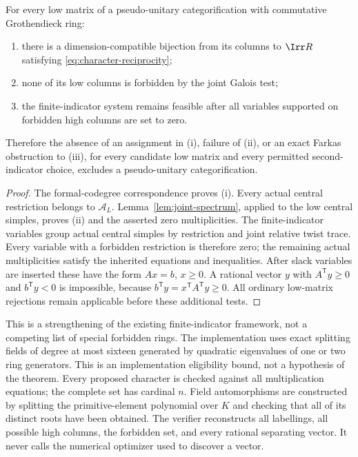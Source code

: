 \begin{theorem}
\label{thm:character-induction}
For every low matrix of a pseudo-unitary categorification with
commutative Grothendieck ring:
\begin{enumerate}[label=(\roman*)]
\item there is a dimension-compatible bijection from its columns to
$\Irr R$ satisfying \eqref{eq:character-reciprocity};
\item none of its low columns is forbidden by the joint Galois test;
\item the finite-indicator system remains feasible after all variables
supported on forbidden high columns are set to zero.
\end{enumerate}
Therefore the absence of an assignment in (i), failure of (ii), or an
exact Farkas obstruction to (iii), for every candidate low matrix and
every permitted second-indicator choice, excludes a pseudo-unitary
categorification.
\end{theorem}
\begin{proof}
The formal-codegree correspondence proves (i). Every actual central
restriction belongs to $\mathcal A_L$. Lemma~\ref{lem:joint-spectrum},
applied to the low central simples, proves (ii) and the asserted zero
multiplicities. The finite-indicator variables group actual central
simples by restriction and joint relative twist trace. Every variable
with a forbidden restriction is therefore zero; the remaining actual
multiplicities satisfy the inherited equations and inequalities.
After slack variables are inserted these have the form $Ax=b$, $x\ge0$.
A rational vector $y$ with $A^{\mathsf T}y\ge0$ and $b^{\mathsf T}y<0$
is impossible, because $b^{\mathsf T}y=x^{\mathsf T}A^{\mathsf T}y\ge0$.
All ordinary low-matrix rejections remain applicable before these
additional tests.
\end{proof}

This is a strengthening of the existing finite-indicator framework,
not a competing list of special forbidden rings. The implementation
uses exact splitting fields of degree at most sixteen generated by
quadratic eigenvalues of one or two ring generators. This is an
implementation eligibility bound, not a hypothesis of the theorem.
Every proposed character is checked against all multiplication
equations; the complete set has cardinal $n$. Field automorphisms are
constructed by splitting the primitive-element polynomial over $K$ and
checking that all of its distinct roots have been obtained. The verifier
reconstructs all labellings, all possible high columns, the forbidden
set, and every rational separating vector. It never calls the numerical
optimizer used to discover a vector.

